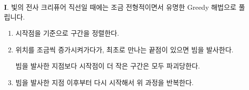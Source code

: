 \begin{frame}{\textbf{I}. 빛의 전사 크리퓨어}
    직선일 때에는 조금 전형적이면서 유명한 Greedy 해법으로 풀립니다.
    
    \vspace{18pt}
    
    \begin{enumerate}
        \item 시작점을 기준으로 구간을 정렬한다.
        \item 위치를 조금씩 증가시켜가다가, 최초로 만나는 끝점이 있으면 빔을 발사한다.
        
        빔을 발사한 지점보다 시작점이 더 작은 구간은 모두 파괴당한다.
        
        \item 빔을 발사한 지점 이후부터 다시 시작해서 위 과정을 반복한다.
    \end{enumerate}
\end{frame}

